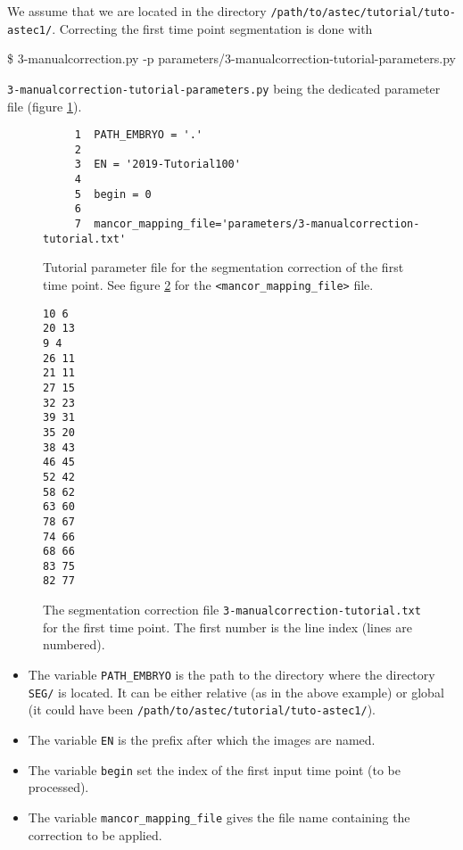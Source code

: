 We assume that we are located in the directory
\texttt{/path/to/astec/tutorial/tuto-astec1/}. Correcting the first
time point segmentation is
done with
\begin{code}{0.8}
  \$ 3-manualcorrection.py -p parameters/3-manualcorrection-tutorial-parameters.py 
\end{code}
\texttt{3-manualcorrection-tutorial-parameters.py} being the
dedicated parameter file  (figure \ref{fig:tutorial:parameter:manual:correction}).

\begin{figure}
\begin{framed}
\begin{verbatim}
     1	PATH_EMBRYO = '.'
     2	
     3	EN = '2019-Tutorial100'
     4	
     5	begin = 0
     6	
     7	mancor_mapping_file='parameters/3-manualcorrection-tutorial.txt'
\end{verbatim}
\end{framed}
\caption{\label{fig:tutorial:parameter:manual:correction} Tutorial
  parameter file for the segmentation correction of the first time
  point. See figure
  \protect\ref{fig:tutorial:parameter:manual:correction:file} for the
  \texttt{<mancor\_mapping\_file>} file.}
\end{figure}

\begin{figure}
\begin{framed}
\begin{verbatim}
10 6
20 13
9 4
26 11
21 11
27 15
32 23
39 31
35 20
38 43
46 45
52 42
58 62
63 60
78 67
74 66
68 66
83 75
82 77
\end{verbatim}
\end{framed}
\caption{\label{fig:tutorial:parameter:manual:correction:file}
  The segmentation correction file
  \texttt{3-manualcorrection-tutorial.txt} for the first time point. The first
  number is the line index (lines are numbered).}
\end{figure}

\begin{itemize}
  \itemsep -1ex
  \item The variable \texttt{PATH\_EMBRYO} is the path to the directory where
    the directory \texttt{SEG/} is located. It can be either relative (as in the
    above example) or
    global (it could have been \texttt{/path/to/astec/tutorial/tuto-astec1/}).
  \item The variable \texttt{EN} is the prefix after which the  images
    are named. 
  \item The variable \texttt{begin} set  the
    index of the first input time point (to be processed).
  \item The variable \texttt{mancor\_mapping\_file} gives the file
    name containing the correction to be applied.
\end{itemize}

